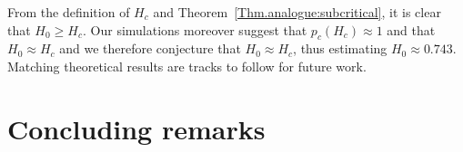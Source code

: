 \documentclass[10pt,a4paper]{amsart}
\theoremstyle{exampstyle}
\theoremstyle{exampnotations}
\begin{document}
\noindent From the definition of $H_c$ and Theorem~\ref{Thm.analogue:subcritical}, it is clear that $H_0 \geq H_c$. Our simulations moreover suggest that $p_c(H_c)\approx 1$ and that $H_0 \approx H_c$ and we therefore conjecture that $H_0 \approx H_c$, thus estimating $H_0 \approx 0.743$. Matching theoretical results are tracks to follow for future work.


\newpage
\section{Concluding remarks}
\label{S.Conclusion}
\end{document}

